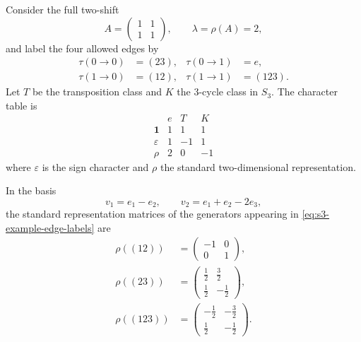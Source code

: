 Consider the full two-shift
\[
  A=
  \begin{pmatrix}
    1 & 1 \\
    1 & 1
  \end{pmatrix},
  \qquad
  \lambda=\rho(A)=2,
\]
and label the four allowed edges by
\begin{equation}\label{eq:s3-example-edge-labels}
  \begin{aligned}
    \tau(0\to 0)&=(23), & \tau(0\to 1)&=e, \\
    \tau(1\to 0)&=(12), & \tau(1\to 1)&=(123).
  \end{aligned}
\end{equation}
Let \(T\) be the transposition class and \(K\) the \(3\)-cycle class in
\(S_3\). The character table is
\begin{equation}\label{eq:s3-character-table}
  \begin{array}{c|ccc}
    & e & T & K \\ \hline
    \mathbf 1 & 1 & 1 & 1 \\
    \varepsilon & 1 & -1 & 1 \\
    \rho & 2 & 0 & -1
  \end{array}
\end{equation}
where \(\varepsilon\) is the sign character and \(\rho\) the standard
two-dimensional representation.

In the basis
\[
  v_1=e_1-e_2,\qquad v_2=e_1+e_2-2e_3,
\]
the standard representation matrices of the generators appearing in
\eqref{eq:s3-example-edge-labels} are
\begin{equation}\label{eq:s3-standard-representation-matrices}
  \begin{aligned}
    \rho((12))
    &=
    \begin{pmatrix}
      -1 & 0 \\
      0 & 1
    \end{pmatrix}, \\
    \rho((23))
    &=
    \begin{pmatrix}
      \frac12 & \frac32 \\
      \frac12 & -\frac12
    \end{pmatrix}, \\
    \rho((123))
    &=
    \begin{pmatrix}
      -\frac12 & -\frac32 \\
      \frac12 & -\frac12
    \end{pmatrix}.
  \end{aligned}
\end{equation}

